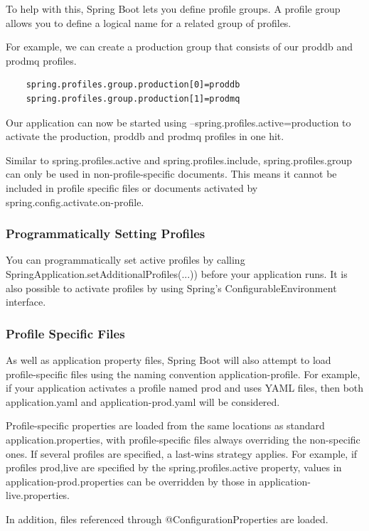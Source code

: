 \documentclass{scrartcl}
\begin{document}
To help with this, Spring Boot lets you define profile groups. A profile group allows you to define a logical name for a related group of profiles.

For example, we can create a production group that consists of our proddb and prodmq profiles.
\begin{lstlisting}
    spring.profiles.group.production[0]=proddb
    spring.profiles.group.production[1]=prodmq
\end{lstlisting}

Our application can now be started using --spring.profiles.active=production to activate the production, proddb and prodmq profiles in one hit.

Similar to spring.profiles.active and spring.profiles.include, spring.profiles.group can only be used in non-profile-specific documents. This means it cannot be included in profile specific files or documents activated by spring.config.activate.on-profile.

\subsubsection{Programmatically Setting Profiles}

You can programmatically set active profiles by calling SpringApplication.setAdditionalProfiles(...)) before your application runs. It is also possible to activate profiles by using Spring’s ConfigurableEnvironment interface.

\subsubsection{Profile Specific Files}

As well as application property files, Spring Boot will also attempt to load profile-specific files using the naming convention application-{profile}. For example, if your application activates a profile named prod and uses YAML files, then both application.yaml and application-prod.yaml will be considered.

Profile-specific properties are loaded from the same locations as standard application.properties, with profile-specific files always overriding the non-specific ones. If several profiles are specified, a last-wins strategy applies. For example, if profiles prod,live are specified by the spring.profiles.active property, values in application-prod.properties can be overridden by those in application-live.properties.

In addition, files referenced through @ConfigurationProperties are loaded.
\end{document}
